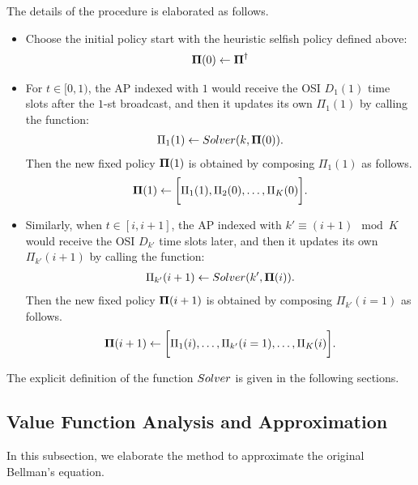 The details of the procedure is elaborated as follows.
\begin{itemize}
    \item Choose the initial policy start with the heuristic selfish policy defined above:
    \begin{align*}
        \boldsymbol{\Pi}(0) \gets \boldsymbol{\Pi}^{\dagger}
    \end{align*}

    \item For $t\in[0, 1)$, the AP indexed with $1$ would receive the OSI $D_1(1)$ time slots after the $1$-st broadcast, and then it updates its own $\Pi_{1}(1)$ by calling the function:
    \begin{align*}
        \Pi_{1}(1) \gets Solver(k, \boldsymbol{\Pi}(0)).
    \end{align*}
    Then the new fixed policy $\boldsymbol{\Pi}(1)$ is obtained by composing $\Pi_{1}(1)$ as follows.
    \begin{align*}
        \boldsymbol{\Pi}(1) \gets \bigg[\Pi_{1}(1), \Pi_{2}(0), \dots, \Pi_{K}(0)\bigg].
    \end{align*}

    \item Similarly, when $t\in[i, i+1]$, the AP indexed with $k' \equiv (i + 1)\mod{K}$ would receive the OSI $D_{k'}$ time slots later, and then it updates its own $\Pi_{k'}(i+1)$ by calling the function:
    \begin{align*}
        \Pi_{k'}(i+1) \gets Solver(k', \boldsymbol{\Pi}(i)).
    \end{align*}
    Then the new fixed policy $\boldsymbol{\Pi}(i+1)$ is obtained by composing $\Pi_{k'}(i=1)$ as follows.
    \begin{align*}
        \boldsymbol{\Pi}(i+1) \gets \bigg[\Pi_{1}(i), \dots, \Pi_{k'}(i=1), \dots, \Pi_{K}(i)\bigg].
    \end{align*}
\end{itemize}
The explicit definition of the function $Solver$ is given in the following sections.

\subsection{Value Function Analysis and Approximation}
In this subsection, we elaborate the method to approximate the original Bellman's equation.

